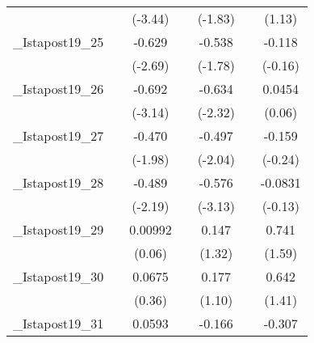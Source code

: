 {\begin{tabular}{l*{6}{c}}
            &                     &     (-3.44)         &                     &     (-1.83)         &                     &      (1.13)         \\
[1em]
\_Istapost19\_25&                     &      -0.629\sym{*}  &                     &      -0.538         &                     &      -0.118         \\
            &                     &     (-2.69)         &                     &     (-1.78)         &                     &     (-0.16)         \\
[1em]
\_Istapost19\_26&                     &      -0.692\sym{**} &                     &      -0.634\sym{*}  &                     &      0.0454         \\
            &                     &     (-3.14)         &                     &     (-2.32)         &                     &      (0.06)         \\
[1em]
\_Istapost19\_27&                     &      -0.470         &                     &      -0.497         &                     &      -0.159         \\
            &                     &     (-1.98)         &                     &     (-2.04)         &                     &     (-0.24)         \\
[1em]
\_Istapost19\_28&                     &      -0.489\sym{*}  &                     &      -0.576\sym{**} &                     &     -0.0831         \\
            &                     &     (-2.19)         &                     &     (-3.13)         &                     &     (-0.13)         \\
[1em]
\_Istapost19\_29&                     &     0.00992         &                     &       0.147         &                     &       0.741         \\
            &                     &      (0.06)         &                     &      (1.32)         &                     &      (1.59)         \\
[1em]
\_Istapost19\_30&                     &      0.0675         &                     &       0.177         &                     &       0.642         \\
            &                     &      (0.36)         &                     &      (1.10)         &                     &      (1.41)         \\
[1em]
\_Istapost19\_31&                     &      0.0593         &                     &      -0.166         &                     &      -0.307         \\

\end{tabular}}
